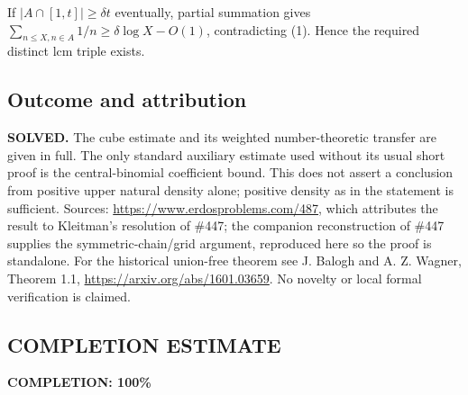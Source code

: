 If $|A\cap[1,t]|\ge\delta t$ eventually, partial summation gives $\sum_{n\le X,n\in A}1/n\ge\delta\log X-O(1)$, contradicting (1). Hence the required distinct lcm triple exists.

\subsection*{Outcome and attribution}
\textbf{SOLVED.} The cube estimate and its weighted number-theoretic transfer are given in full. The only standard auxiliary estimate used without its usual short proof is the central-binomial coefficient bound. This does not assert a conclusion from positive upper natural density alone; positive density as in the statement is sufficient.
Sources: \url{https://www.erdosproblems.com/487}, which attributes the result to Kleitman's resolution of \#447; the companion reconstruction of \#447 supplies the symmetric-chain/grid argument, reproduced here so the proof is standalone. For the historical union-free theorem see J. Balogh and A. Z. Wagner, Theorem 1.1, \url{https://arxiv.org/abs/1601.03659}. No novelty or local formal verification is claimed.

\subsection*{COMPLETION ESTIMATE}
\textbf{COMPLETION: 100\%}
